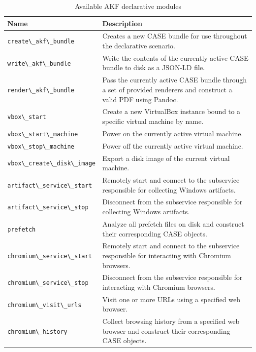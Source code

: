 \documentclass[letterpaper,12pt]{report}
\newcommand{\passthrough}[1]{#1}
\begin{document}
{
\small %
\begin{longtable}[]{@{}
  >{\raggedright\arraybackslash}p{}
  >{\raggedright\arraybackslash}p{}
@{}}
\caption{Available AKF declarative modules}\label{tbl:akf-declarative-modules} \\
\toprule\noalign{}
\begin{minipage}[b]{\linewidth}\raggedright
Name
\end{minipage} & \begin{minipage}[b]{\linewidth}\raggedright
Description
\end{minipage} \\
\midrule\noalign{}
\endhead
\bottomrule\noalign{}
\endlastfoot
\passthrough{\lstinline!create\_akf\_bundle!} & Creates a new CASE
bundle for use throughout the declarative scenario. \\
\passthrough{\lstinline!write\_akf\_bundle!} & Write the contents of the
currently active CASE bundle to disk as a JSON-LD file. \\
\passthrough{\lstinline!render\_akf\_bundle!} & Pass the currently
active CASE bundle through a set of provided renderers and construct a
valid PDF using Pandoc. \\
\passthrough{\lstinline!vbox\_start!} & Create a new VirtualBox instance
bound to a specific virtual machine by name. \\
\passthrough{\lstinline!vbox\_start\_machine!} & Power on the currently
active virtual machine. \\
\passthrough{\lstinline!vbox\_stop\_machine!} & Power off the currently
active virtual machine. \\
\passthrough{\lstinline!vbox\_create\_disk\_image!} & Export a disk
image of the current virtual machine. \\
\passthrough{\lstinline!artifact\_service\_start!} & Remotely start and
connect to the subservice responsible for collecting Windows
artifacts. \\
\passthrough{\lstinline!artifact\_service\_stop!} & Disconnect from the
subservice responsible for collecting Windows artifacts. \\
\passthrough{\lstinline!prefetch!} & Analyze all prefetch files on disk
and construct their corresponding CASE objects. \\
\passthrough{\lstinline!chromium\_service\_start!} & Remotely start and
connect to the subservice responsible for interacting with Chromium
browsers. \\
\passthrough{\lstinline!chromium\_service\_stop!} & Disconnect from the
subservice responsible for interacting with Chromium browsers. \\
\passthrough{\lstinline!chromium\_visit\_urls!} & Visit one or more URLs
using a specified web browser. \\
\passthrough{\lstinline!chromium\_history!} & Collect browsing history
from a specified web browser and construct their corresponding CASE
objects. \\
\end{longtable}
}
\end{document}
